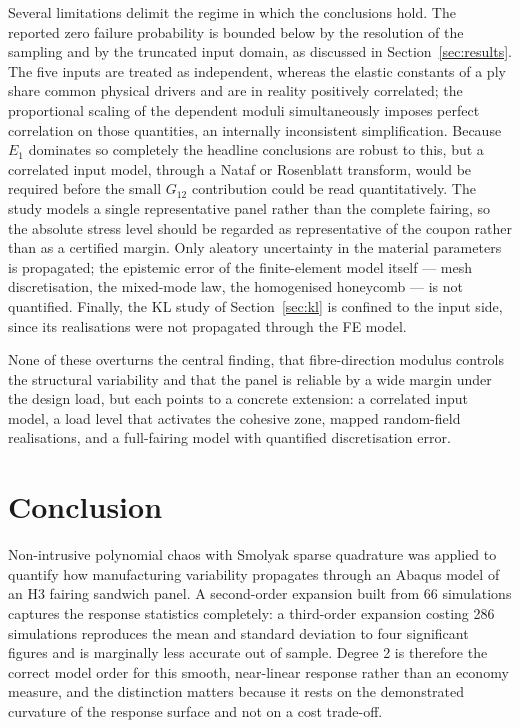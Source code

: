 \documentclass[review,3p,times,12pt,nopreprintline]{elsarticle}
\begin{document}
Several limitations delimit the regime in which the conclusions hold. The reported zero
failure probability is bounded below by the resolution of the sampling and by the truncated
input domain, as discussed in Section~\ref{sec:results}. The five inputs are treated as
independent, whereas the elastic constants of a ply share common physical drivers and are
in reality positively correlated; the proportional scaling of the dependent moduli
simultaneously imposes perfect correlation on those quantities, an internally inconsistent
simplification. Because $E_1$ dominates so completely the headline conclusions are robust to
this, but a correlated input model, through a Nataf or Rosenblatt transform, would be
required before the small $G_{12}$ contribution could be read quantitatively. The study
models a single representative panel rather than the complete fairing, so the absolute
stress level should be regarded as representative of the coupon rather than as a certified
margin. Only aleatory uncertainty in the material parameters is propagated; the epistemic
error of the finite-element model itself --- mesh discretisation, the mixed-mode law, the
homogenised honeycomb --- is not quantified. Finally, the KL study of
Section~\ref{sec:kl} is confined to the input side, since its realisations were not
propagated through the FE model.

None of these overturns the central finding, that fibre-direction modulus controls the
structural variability and that the panel is reliable by a wide margin under the design
load, but each points to a concrete extension: a correlated input model, a load level that
activates the cohesive zone, mapped random-field realisations, and a full-fairing model with
quantified discretisation error.

\section{Conclusion}
\label{sec:conclusion}

Non-intrusive polynomial chaos with Smolyak sparse quadrature was applied to quantify how
manufacturing variability propagates through an Abaqus model of an H3 fairing sandwich
panel. A second-order expansion built from 66 simulations captures the response statistics
completely: a third-order expansion costing 286 simulations reproduces the mean and standard
deviation to four significant figures and is marginally less accurate out of sample. Degree
2 is therefore the correct model order for this smooth, near-linear response rather than an
economy measure, and the distinction matters because it rests on the demonstrated curvature
of the response surface and not on a cost trade-off.
\end{document}
